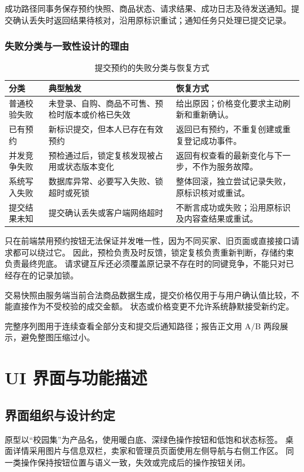 \documentclass[UTF8,zihao=-4,a4paper,fontset=none]{ctexart}
\begin{document}
\noindent\small 成功路径同事务保存预约快照、商品状态、请求结果、成功日志及待发送通知。提交确认丢失时返回结果待核对，沿用原标识重试；通知任务只处理已提交记录。



\clearpage

\subsubsection{失败分类与一致性设计的理由}
\begin{table}[H]\centering\small
\caption{提交预约的失败分类与恢复方式}
\begin{tabularx}{\linewidth}{@{}p{30mm}Y Y@{}}\toprule
分类 & 典型触发 & 恢复方式\\\midrule
普通校验失败 & 未登录、自购、商品不可售、预检时版本或价格已失效 & 给出原因；价格变化要求主动刷新和重新确认。\\
已有预约 & 新标识提交，但本人已存在有效预约 & 返回已有预约，不重复创建或重复登记成功事件。\\
并发竞争失败 & 预检通过后，锁定复核发现被占用或状态版本变化 & 返回有权查看的最新变化与下一步，不作为服务故障。\\
系统写入失败 & 数据库异常、必要写入失败、锁超时或死锁 & 整体回滚，独立尝试记录失败，原标识核对或重试。\\
提交结果未知 & 提交确认丢失或客户端网络超时 & 不断言成功或失败；沿用原标识及内容查结果或重试。\\\bottomrule
\end{tabularx}
\end{table}

只在前端禁用预约按钮无法保证并发唯一性，因为不同买家、旧页面或直接接口请求都可以绕过它。
因此，预检负责及时反馈，锁定复核负责重新判断，存储约束负责最终兜底。
请求键互斥还必须覆盖原记录不存在时的同键竞争，不能只对已经存在的记录加锁。

交易快照由服务端当前合法商品数据生成，提交价格仅用于与用户确认值比较，不能直接作为不受校验的成交金额。
状态或价格变更不允许系统静默接受新约定。

完整序列图用于连续查看全部分支和提交后通知路径；报告正文用 A/B 两段展示，避免整图压缩过小。


\clearpage

\section{UI 界面与功能描述}
\subsection{界面组织与设计约定}
原型以“校园集”为产品名，使用暖白底、深绿色操作按钮和低饱和状态标签。
桌面详情采用图片与信息双栏，卖家和管理员页面使用左侧导航与右侧工作区。
同一类操作保持按钮位置与语义一致，失效或完成后的操作按钮关闭。
\end{document}
